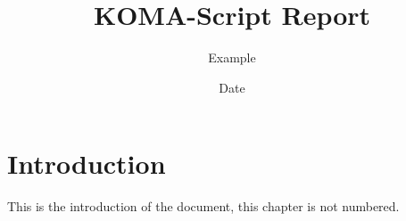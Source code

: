 \documentclass[
    fontsize=10pt,
    twoside=semi,
    usegeometry,
    autoenlargeheadfoot=false,
    toc=bibliography,
    open=any
]{scrreprt}
\title{KOMA-Script Report}
\subtitle{Example}
\date{Date}
\begin{document}
    \maketitle
    \tableofcontents

    \chapter*{Introduction}
    This is the introduction of the document, this chapter is not numbered.
    \clearpage

    

    \printbibliography
\end{document}
